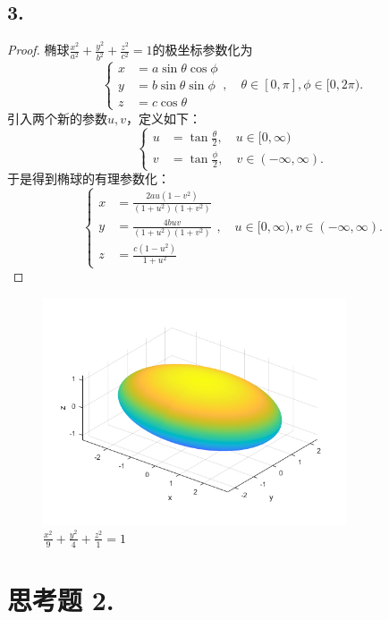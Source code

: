\documentclass[utf8]{ctexart}
\begin{document}
\subsection*{3.}
\begin{proof}
    椭球$\frac{x^2}{a^2}+\frac{y^2}{b^2}+\frac{z^2}{c^2}=1$的极坐标参数化为
    $$
    \begin{cases}
        x &= a\sin{\theta}\cos{\phi}\\
        y &= b\sin{\theta}\sin{\phi}\\
        z &= c\cos{\theta}
    \end{cases},\quad
    \theta \in [0, \pi], \phi \in [0,2\pi).
    $$
    引入两个新的参数$u,v$，定义如下：
    $$
    \begin{cases}
        u &= \tan{\frac{\theta}{2}},\quad u \in [0,\infty)\\
        v &= \tan{\frac{\phi}{2}}, \quad v \in (-\infty, \infty).
    \end{cases}
    $$
    于是得到椭球的有理参数化：
    $$
    \begin{cases}
        x &= \frac{2au(1-v^2)}{(1+u^2)(1+v^2)}\\
        y &= \frac{4buv}{(1+u^2)(1+v^2)}\\
        z &= \frac{c(1-u^2)}{1+u^2}
    \end{cases},
    \quad u \in [0,\infty), v \in (-\infty, \infty).
    $$
\end{proof}
\begin{figure}[H]
    \centering
    \includegraphics[width=0.8\textwidth]{ellipsoid.png}
    \caption{$\frac{x^2}{9}+\frac{y^2}{4}+\frac{z^2}{1}=1$}
    \label{fig: ellipsoid}
\end{figure}

\section*{思考题 2.}
\end{document}
